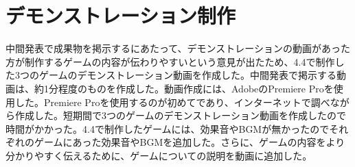\section{デモンストレーション制作}
中間発表で成果物を掲示するにあたって、デモンストレーションの動画があった方が制作するゲームの内容が伝わりやすいという意見が出たため、4.4で制作した3つのゲームのデモンストレーション動画を作成した。中間発表で掲示する動画は、約1分程度のものを作成した。動画作成には、AdobeのPremiere Proを使用した。Premiere Proを使用するのが初めてであり、インターネットで調べながら作成した。短期間で3つのゲームのデモンストレーション動画を作成したので時間がかかった。4.4で制作したゲームには、効果音やBGMが無かったのでそれぞれのゲームにあった効果音やBGMを追加した。さらに、ゲームの内容をより分かりやすく伝えるために、ゲームについての説明を動画に追加した。
